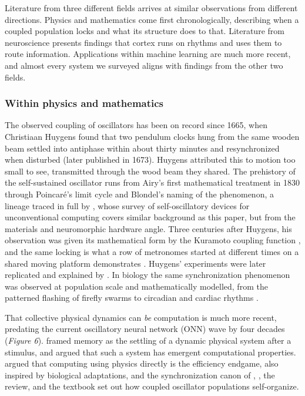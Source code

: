 \documentclass[10pt]{article}
\begin{document}
Literature from three different fields arrives at similar observations
from different directions. Physics and mathematics come first
chronologically, describing when a coupled population locks and what its
structure does to that. Literature from neuroscience presents findings
that cortex runs on rhythms and uses them to route information.
Applications within machine learning are much more recent, and almost
every system we surveyed aligns with findings from the other two fields.

\subsubsection{Within physics and mathematics}\label{sec-1-2-1}

The observed coupling of oscillators has been on record since 1665, when
Christiaan Huygens found that two pendulum clocks hung from the same
wooden beam settled into antiphase within about thirty minutes and
resynchronized when disturbed (later published in 1673). Huygens
attributed this to motion too small to see, transmitted through the wood
beam they shared. The prehistory of the self-sustained oscillator runs
from Airy's first mathematical treatment in 1830 through Poincaré's
limit cycle and Blondel's naming of the phenomenon, a lineage traced in
full by \citet{rivera-sierra2026}, whose survey of self-oscillatory
devices for unconventional computing covers similar background as this
paper, but from the materials and neuromorphic hardware angle. Three
centuries after Huygens, his observation was given its mathematical form
by the Kuramoto coupling function \citep{kuramoto1975}, and the same
locking is what a row of metronomes started at different times on a
shared moving platform demonstrates \citep{pantaleone2002}. Huygens'
experiments were later replicated and explained by \citet{bennett2002}.
In biology the same synchronization phenomenon was observed at
population scale and mathematically modelled, from the patterned
flashing of firefly swarms to circadian and cardiac rhythms
\citep{strogatz1993}.

That collective physical dynamics can \emph{be} computation is much more
recent, predating the current oscillatory neural network (ONN) wave by
four decades (\emph{Figure 6}). \citet{hopfield1982} framed memory as
the settling of a dynamic physical system after a stimulus, and argued
that such a system has emergent computational properties.
\citet{mead1990} argued that computing using physics directly is the
efficiency endgame, also inspired by biological adaptations, and the
synchronization canon of \citet{winfree1967}, \citet{kuramoto1975}, the
\citet{strogatz2000} review, and the \citet{pikovsky2001} textbook set
out how coupled oscillator populations self-organize.
\end{document}
